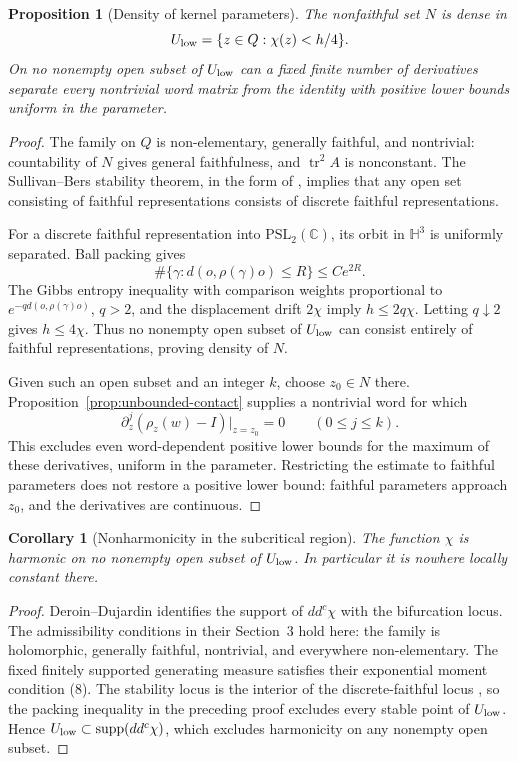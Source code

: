 \documentclass[11pt,letterpaper]{amsart}
\newtheorem{proposition}[theorem]{Proposition}
\newtheorem{corollary}[theorem]{Corollary}
\theoremstyle{definition}
\theoremstyle{remark}
\numberwithin{equation}{section}
\begin{document}
\begin{proposition}[Density of kernel parameters]
\label{prop:dense-kernels}
The nonfaithful set $N$ is dense in
\[
 U_{\rm low}=\{z\in Q:\chi(z)<h/4\}.
\]
On no nonempty open subset of $U_{\rm low}$ can a fixed finite
number of derivatives separate every nontrivial word matrix from
the identity with positive lower bounds uniform in the parameter.
\end{proposition}
\begin{proof}
The family on $Q$ is non-elementary, generally faithful, and
nontrivial: countability of $N$ gives general faithfulness, and
$\operatorname{tr}^2A$ is nonconstant. The Sullivan--Bers stability
theorem, in the form of \cite[Theorem~2.6]{DD}, implies that any
open set consisting of faithful representations consists of discrete
faithful representations.

For a discrete faithful representation into $\mathrm{PSL}_2(\mathbb C)$,
its orbit in $\mathbb H^3$ is uniformly separated. Ball packing gives
\[
 \#\{\gamma:d(o,\rho(\gamma)o)\le R\}\le Ce^{2R}.
\]
The Gibbs entropy inequality with comparison weights proportional
to $e^{-q d(o,\rho(\gamma)o)}$, $q>2$, and the displacement drift
$2\chi$ imply $h\le2q\chi$. Letting $q\downarrow2$ gives
$h\le4\chi$. Thus no nonempty open subset of $U_{\rm low}$ can
consist entirely of faithful representations, proving density of $N$.

Given such an open subset and an integer $k$, choose $z_0\in N$
there. Proposition~\ref{prop:unbounded-contact} supplies a nontrivial
word for which
\[
 \partial_z^j(\rho_z(w)-I)\big|_{z=z_0}=0
 \qquad(0\le j\le k).
\]
This excludes even word-dependent positive lower bounds for the
maximum of these derivatives, uniform in the parameter. Restricting
the estimate to faithful parameters does not restore a positive
lower bound: faithful parameters approach $z_0$, and the derivatives
are continuous.
\end{proof}

\begin{corollary}[Nonharmonicity in the subcritical region]
\label{cor:no-flat-patches}
The function $\chi$ is harmonic on no nonempty open subset of
$U_{\rm low}$. In particular it is nowhere locally constant there.
\end{corollary}
\begin{proof}
Deroin--Dujardin \cite[Definition~3.2 and Theorem~3.9]{DD} identifies
the support of $dd^c\chi$ with the bifurcation locus. The admissibility
conditions in their Section~3 hold here: the family is holomorphic,
generally faithful, nontrivial, and everywhere non-elementary.
The fixed finitely supported generating measure satisfies their
exponential moment condition (8). The stability locus is the interior
of the discrete-faithful locus \cite[Theorem~2.6]{DD}, so the packing
inequality in the preceding proof excludes every stable point of
$U_{\rm low}$. Hence
$U_{\rm low}\subset\operatorname{supp}(dd^c\chi)$, which excludes
harmonicity on any nonempty open subset.
\end{proof}
\end{document}
